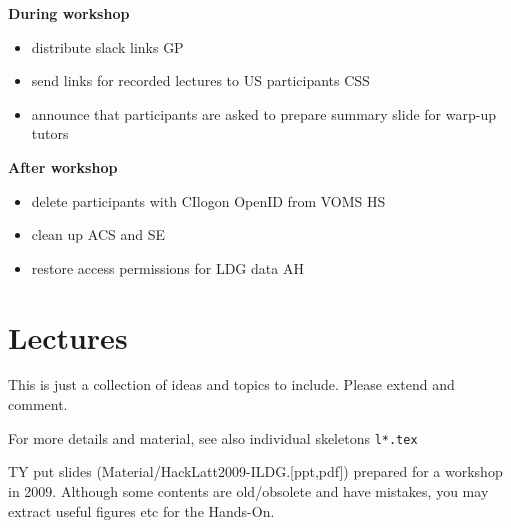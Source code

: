 \documentclass{article}
\begin{document}
{\bf During workshop}
\begin{itemize}
    \item distribute slack links \hfill GP
    \item send links for recorded lectures to US participants \hfill CSS
    \item announce that participants are asked to prepare summary slide for warp-up \hfill tutors
\end{itemize}

{\bf After workshop}
\begin{itemize}
    \item delete participants with CIlogon OpenID from VOMS \hfill{HS}
    \item clean up ACS and SE
    \item restore access permissions for LDG data \hfill{AH}
\end{itemize}

\newpage
\section{Lectures}
This is just a collection of ideas and topics to include. Please
extend and comment.

For more details and material, see also individual skeletons {\tt l*.tex}

TY put slides (Material/HackLatt2009-ILDG.[ppt,pdf]) prepared for a workshop in 2009.
Although some contents are old/obsolete and have mistakes, you may extract useful figures etc
for the Hands-On.
\end{document}

